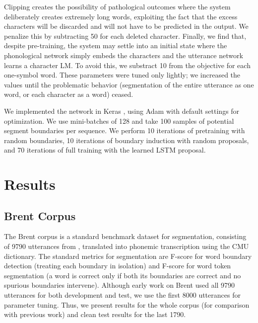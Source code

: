 \documentclass[11pt,letterpaper]{article}
\begin{document}
Clipping creates the possibility of pathological outcomes where the
system deliberately creates extremely long words, exploiting the fact
that the excess characters will be discarded and will not have to be
predicted in the output. We penalize this by subtracting 50 for each
deleted character. Finally, we find that, despite pre-training, the
system may settle into an initial state where the phonological network
simply embeds the characters and the utterance network learns a
character LM. To avoid this, we substract 10 from the objective for
each one-symbol word. These parameters were tuned only lightly; we
increased the values until the problematic behavior (segmentation of
the entire utterance as one word, or each character as a word) ceased.

We implemented the network in Keras \cite{Keras}, using Adam \cite{Kingma14}
with default settings for optimization. We use mini-batches of 128 and
take 100 samples of potential segment boundaries per sequence. We
perform 10 iterations of pretraining with random boundaries, 10
iterations of boundary induction with random proposals, and 70
iterations of full training with the learned LSTM proposal.

\section{Results}

\subsection{Brent Corpus}

The Brent corpus \cite{Brent99} is a standard benchmark dataset for
segmentation, consisting of 9790 utterances from
, translated into phonemic transcription using
the CMU dictionary. The standard metrics for segmentation are F-score
for word boundary detection (treating each boundary in isolation) and
F-score for word token segmentation (a word is correct only if both
its boundaries are correct and no spurious boundaries
intervene). Although early work on Brent used all 9790 utterances for
both development and test, we use the first 8000 utterances for
parameter tuning. Thus, we present results for the whole corpus (for
comparison with previous work) and clean test results for the last
1790.

\end{document}
